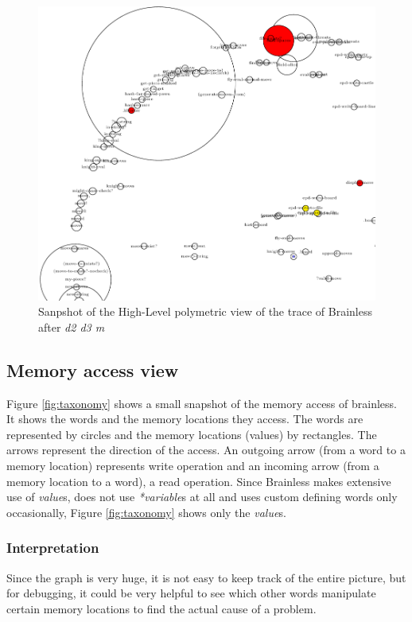 \begin{figure}[p]
    \centering
    \includegraphics[scale=0.5]{graphics/polymetric_view_detail.png}
    \caption{Sanpshot of the High-Level polymetric view of the trace of Brainless after \emph{d2 d3 m}}
    \label{fig:polymetric_view_detail}
\end{figure}

\subsection*{Memory access view}

Figure \ref{fig:taxonomy} shows a small snapshot of the memory access of brainless.
It shows the words and the memory locations they access. The words are represented by circles and the memory locations (values) by rectangles. The arrows represent the direction of the access. An outgoing arrow (from a word to a memory location) represents write operation and an incoming arrow (from a memory location to a word), a read operation.
Since Brainless makes extensive use of \emph{value}s, does not use \emph{*variable}s at all and uses custom defining words only occasionally, Figure \ref{fig:taxonomy} shows only the \emph{value}s.

\subsubsection*{Interpretation}

Since the graph is very huge, it is not easy to keep track of the entire picture, but for debugging, it could be very helpful to see which other words manipulate certain memory locations to find the actual cause of a problem.

